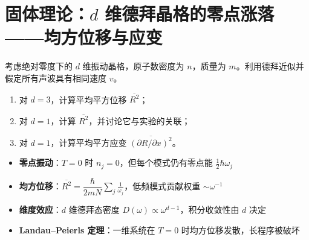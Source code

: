 \section{固体理论：$d$ 维德拜晶格的零点涨落——均方位移与应变}
\label{sec:d-dimensional-fluctuation}

\begin{modelbox}[题目：$d$ 维晶格在绝对零度下的零点涨落]
考虑绝对零度下的 $d$ 维振动晶格，原子数密度为 $n$，质量为 $m$。利用德拜近似并假定所有声波具有相同速度 $v$。
\begin{enumerate}
    \item 对 $d=3$，计算平均平方位移 $\overline{R^2}$；
    \item 对 $d=1$，计算 $\overline{R^2}$，并讨论它与实验的关联；
    \item 对 $d=1$，计算平均平方应变 $\overline{(\partial R/\partial x)^2}$。
\end{enumerate}
\end{modelbox}

\begin{tipbox}[考点快速分析]
\begin{itemize}
    \item \textbf{零点振动}：$T=0$ 时 $n_j=0$，但每个模式仍有零点能 $\frac12\hbar\omega_j$
    \item \textbf{均方位移}：$\overline{R^2}=\dfrac{\hbar}{2mN}\displaystyle\sum_j\frac{1}{\omega_j}$，低频模式贡献权重 $\sim\omega^{-1}$
    \item \textbf{维度效应}：$d$ 维德拜态密度 $D(\omega)\propto\omega^{d-1}$，积分收敛性由 $d$ 决定
    \item \textbf{Landau--Peierls 定理}：一维系统在 $T=0$ 时均方位移发散，长程序被破坏
\end{itemize}
\end{tipbox}

